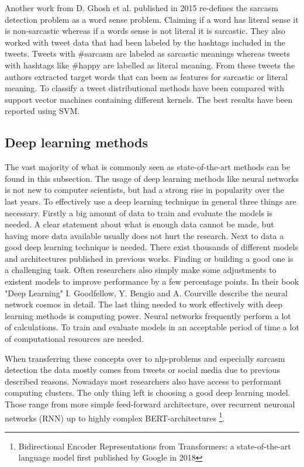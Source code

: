 \documentclass[sigconf,  review=false, nonacm=true]{acmart}
\begin{document}
Another work from D. Ghosh et al. published in 2015 \cite{Sarcastic-or-Not} re-defines the sarcasm detection problem as a word sense problem. Claiming if a word has literal sense it is non-sarcastic whereas if a words sense is not literal it is sarcastic. They also worked with tweet data that had been labeled by the hashtags included in the tweets. Tweets with \#sarcasm are labeled as sarcastic meanings whereas tweets with hashtags like \#happy are labelled as literal meaning. From these tweets the authors extracted target words that can been as features for sarcastic or literal meaning. To classify a tweet distributional methods have been compared with support vector machines containing different kernels. The best results have been reported using SVM. 


\subsection{Deep learning methods}

The vast majority of what is commonly seen as state-of-the-art methods can be found in this subsection. The usage of deep learning methods like neural networks is not new to computer scientists, but had a strong rise in popularity over the last years.
To effectively use a deep learning technique in general three things are necessary. Firstly a big amount of data to train and evaluate the models is needed. A clear statement about what is enough data cannot be made, but having more data available usually does not hurt the research.
Next to data a good deep learning technique is needed. There exist thousands of different models and architectures published in previous works. Finding or building a good one is a challenging task. Often researchers also simply make some adjustments to existent models to improve performance by a few percentage points. In their book "Deep Learning" I. Goodfellow, Y. Bengio and A. Courville \cite{goodfellow2016deep} describe the neural network cosmos in detail. 
The last thing needed to work effectively with deep learning methods is computing power. Neural networks frequently perform a lot of calculations. To train and evaluate models in an acceptable period of time a lot of computational resources are needed.

When transferring these concepts over to nlp-problems and especially sarcasm detection the data mostly comes from tweets or social media due to previous described reasons. Nowadays most researchers also have access to performant computing clusters. The only thing left is choosing a good deep learning model. Those range from more simple feed-forward architecture, over recurrent neuronal networks (RNN) up to highly complex BERT-architectures \footnote{Bidirectional Encoder Representations from Transformers: a state-of-the-art language model first published by Google in 2018}.
\end{document}
